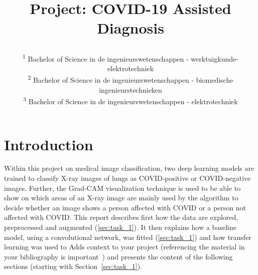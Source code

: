 \documentclass[conference]{IEEEtran}
\begin{document}
\title{Project: COVID-19 Assisted Diagnosis\\


\author{
\and
{}
\and
{}
\and
{}
\and

\textsuperscript{1} Bachelor of Science in de ingenieurswetenschappen - werktuigkunde-elektrotechniek \hfill\\
\textsuperscript{2} Bachelor of Science in de ingenieurswetenschappen - biomedische ingenieurstechnieken\hfill\\
\textsuperscript{3}  Bachelor of Science in de ingenieurswetenschappen - elektrotechniek\hfill}
}
\maketitle



\section{Introduction}
Within this project on medical image classification, two deep learning models are trained to classify X-ray images of lungs as COVID-positive or COVID-negative images. Further, the Grad-CAM visualization technique is used to be able to show on which areas of an X-ray image are mainly used by the algorithm to decide whether an image shows a person affected with COVID or a person not affected with COVID. This report describes first how the data are explored, preprocessed and augmented (\ref{sec:task_1}). It then explains how a baseline model, using a convolutional network, was fitted (\ref{sec:task_1}) and how transfer learning was used to
Adds context to your project (referencing the material in your bibliography is important~\cite{b1, b2}) and presents the content of the following sections (starting with Section~\ref{sec:task_1}).
\end{document}
